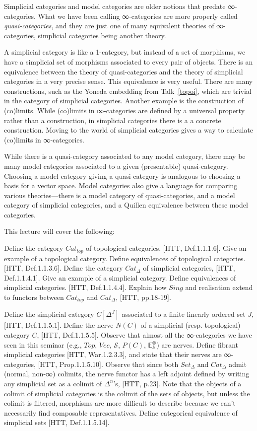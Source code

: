 \documentclass[a4paper]{amsart}
\numberwithin{figure}{section}
\theoremstyle{theorem}
\theoremstyle{definition}
\newcommand{\EE}{\mathbb{E}}
\newcommand{\grVec}{{Vec}}
\newcommand{\Sp}{{\mathcal{S}}}
\begin{document}
Simplicial categories and model categories are older notions that predate ∞-categories. What we have been calling ∞-categories are more properly called \emph{quasi-categories}, and they are just one of many equivalent theories of ∞-categories, simplicial categories being another theory. 

A simplicial category is like a 1-category, but instead of a set of morphisms, we have a simplicial set of morphisms associated to every pair of objects. There is an equivalence between the theory of quasi-categories and the theory of simplicial categories in a very precise sense. This equivalence is very useful. There are many constructions, such as the Yoneda embedding from Talk~\ref{topoi}, which are trivial in the category of simplicial categories. Another example is the construction of (co)limits. While (co)limits in ∞-categories are defined by a universal property rather than a construction, in simplicial categories there is a a concrete construction. Moving to the world of simplicial categories gives a way to calculate (co)limits in ∞-categories.

While there is a quasi-category associated to any model category, there may be many model categories associated to a given (presentable) quasi-category. Choosing a model category giving a quasi-category is analogous to choosing a basis for a vector space. Model categories also give a language for comparing various theories---there is a model category of quasi-categories, and a model category of simplicial categories, and a Quillen equivalence between these model categories. 

This lecture will cover the following: 

Define the category $Cat_{top}$ of topological categories, [HTT, Def.1.1.1.6]. %
Give an example of a topological category. %
Define equivalences of topological categories. [HTT, Def.1.1.3.6]. %
Define the category $Cat_\Delta$ of simplicial categories, [HTT, Def.1.1.4.1]. %
Give an example of a simplicial category. %
Define equivalences of simplicial categories. [HTT, Def.1.1.4.4]. %
Explain how $Sing$ and realisation extend to functors between $Cat_{top}$ and $Cat_\Delta$, [HTT, pp.18-19]. %

Define the simplicial category $C[\Delta^J]$ associated to a finite linearly ordered set $J$, [HTT, Def.1.1.5.1]. %
Define the nerve $N(C)$ of a simplicial (resp. topological) category $C$, [HTT, Def.1.1.5.5]. %
Observe that almost all the ∞-categories we have seen in this seminar (e.g., $Top$, $\grVec$, $\Sp$, $P(C)$, $\EE^\otimes_k$) are nerves. %
Define fibrant simplicial categories [HTT, War.1.2.3.3], and state that their nerves are ∞-categories, [HTT, Prop.1.1.5.10]. %
Observe that since both $Set_\Delta$ and $Cat_\Delta$ admit (normal, non-∞) colimits, the nerve functor has a left adjoint defined by writing any simplicial set as a colimit of $\Delta^n$'s, [HTT, p.23]. Note that the objects of a colimit of simplicial categories is the colimit of the sets of objects, but unless the colimit is filtered, morphisms are more difficult to describe because we can't necessarily find composable representatives. %
Define categorical equivalence of simplicial sets [HTT, Def.1.1.5.14]. %
\end{document}
